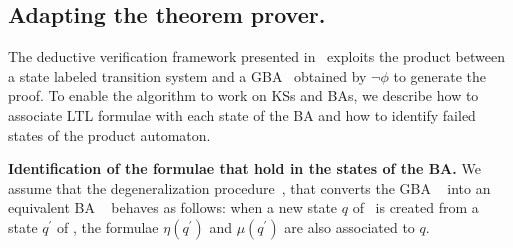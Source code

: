 \subsection{Adapting the theorem prover.}
\label{sec:adapting}
The deductive verification framework presented in~\cite{peled2001model}  exploits the product between a state labeled transition system and  a GBA \gba\ obtained by $\lnot\phi$ to generate the proof.
To enable the algorithm to work on KSs and BAs, 
we describe
 how to associate LTL formulae with each state of the BA and how to identify failed states of the product automaton.

\vskip 0.05in  
\textbf{Identification of the formulae that hold in the states of  the BA.}
We assume that the degeneralization procedure~\cite{clarke1999model}, that converts the GBA  \gba\
 into an equivalent BA \ba\
  behaves as follows: when a new state $q$ of 
  \ba\ is created from a state $q^\prime$ of 
  \gba ,
the formulae $\eta(q^\prime)$ and $\mu(q^\prime)$ are also associated to $q$.

